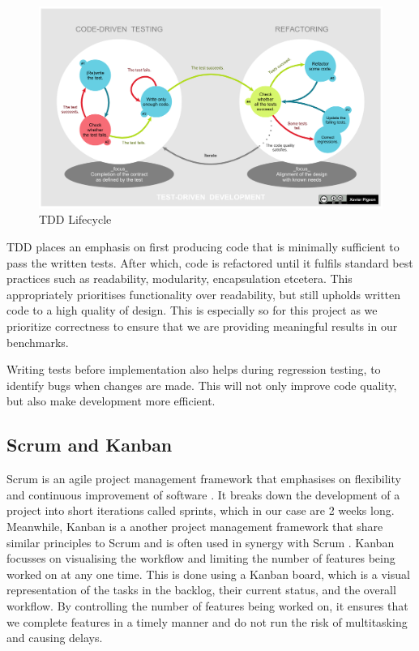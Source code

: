 \begin{figure}[h]
    \centering
    \includegraphics[width=\linewidth]{../assets/TDD_Global_Lifecycle.png}
    \caption{TDD Lifecycle \cite{Wikimedia:TDD}}
    \label{fig:tdd}
\end{figure}

TDD places an emphasis on first producing code that is minimally sufficient 
to pass the written tests. After which, code is refactored until it 
fulfils standard best practices such as readability, modularity, 
encapsulation etcetera. This appropriately prioritises functionality over 
readability, but still upholds written code to a high quality of design. 
This is especially so for this project as we prioritize correctness to 
ensure that we are providing meaningful results in our benchmarks.

Writing tests before implementation also helps during regression testing, to identify bugs 
when changes are made. This will not only improve code quality, but also make development 
more efficient. 


\subsection{Scrum and Kanban} Scrum is an agile project management framework that emphasises on 
flexibility and continuous improvement of software \cite{scrumguide}. 
It breaks down the development of a project 
into short iterations called sprints, which in our case are 2 weeks long. Meanwhile, Kanban is a 
another project management framework that share similar principles to Scrum and is often used 
in synergy with Scrum \cite{kanbanscrum}. Kanban focusses on visualising the workflow and 
limiting the number of features being worked on at any one time. This is done using a Kanban 
board, which is a visual representation of the tasks in the backlog, their current status, and 
the overall workflow. 
By controlling the number of features being worked on, 
it ensures that we complete features in a timely manner and do not run the risk of multitasking 
and causing delays. 

